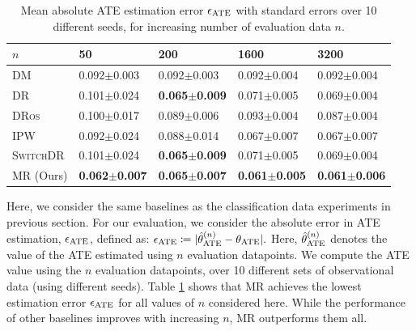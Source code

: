 \begin{table}[t]
    \centering
    \caption{Mean absolute ATE estimation error $\epsilon_{\textup{ATE}}$ with standard errors over 10 different seeds, for increasing number of evaluation data $n$.}
    \label{tab:ate_errors-main}
    \begin{small}
    \begin{tabular}{lllll}
\toprule
$n$ &             50   &             200  &             1600 &             3200 \\
\midrule
DM       &  0.092$\pm$0.003 &  0.092$\pm$0.003 &  0.092$\pm$0.004 &  0.092$\pm$0.004 \\
DR       &  0.101$\pm$0.024 &  \textbf{0.065$\pm$0.009} &  0.071$\pm$0.005 &  0.069$\pm$0.004 \\
\textsc{DRos}     &    0.100$\pm$0.017 &  0.089$\pm$0.006 &   0.093$\pm$0.004 &  0.087$\pm$0.004 \\
IPW      &  0.092$\pm$0.024 &  0.088$\pm$0.014 &  0.067$\pm$0.007 &  0.067$\pm$0.007 \\
\textsc{SwitchDR} &  0.101$\pm$0.024 &  \textbf{0.065$\pm$0.009} &  0.071$\pm$0.005 &  0.069$\pm$0.004 \\
MR (Ours)      &  \textbf{0.062$\pm$0.007} &  \textbf{0.065$\pm$0.007} &  \textbf{0.061$\pm$0.005} &  \textbf{0.061$\pm$0.006} \\
\bottomrule
\end{tabular}
\end{small}
\end{table}
Here, we consider the same baselines as the classification data experiments in previous section.
For our evaluation, we consider the absolute error in ATE estimation, $\epsilon_{\textup{ATE}}$, defined as:
$
\epsilon_{\textup{ATE}} \coloneqq | \hat{\theta}^{(n)}_{\textup{ATE}} - \theta_{\textup{ATE}} |.
$
Here, $\hat{\theta}^{(n)}_{\textup{ATE}}$ denotes the value of the ATE estimated using $n$ evaluation datapoints.
We compute the ATE value using the $n$ evaluation datapoints, over 10 different sets of observational data (using different seeds). Table \ref{tab:ate_errors-main} shows that MR achieves the lowest estimation error $\epsilon_{\textup{ATE}}$ for all values of $n$ considered here. While the performance of other baselines improves with increasing $n$, MR outperforms them all. 


